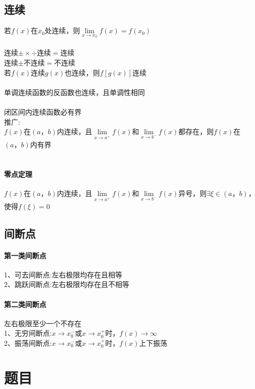 \documentclass{article}
\begin{document}
\begin{flushleft}
	\subsection{连续}
	
	若$f(x)$在$x_0$处连续，则$\lim\limits_{x\to x_0} f(x)=f(x_0)$\\
	~\\
	连续$\pm\times\div$连续$=$连续\\
	连续$\pm$不连续$=$不连续\\
	若$f(x)$连续$g(x)$也连续，则$f[g(x)]$连续\\
	~\\
	单调连续函数的反函数也连续，且单调性相同\\
	~\\
	闭区间内连续函数必有界\\
	推广:\\
	$f(x)$在$(a，b)$内连续，且$\lim\limits_{x\to a^+} f(x)$和$\lim\limits_{x\to b^-} f(x)$都存在，则$f(x)$在$(a，b)$内有界\\
	~\\
	\paragraph{零点定理}
	$f(x)$在$(a，b)$内连续，且$\lim\limits_{x\to a^+} f(x)$和$\lim\limits_{x\to b^-} f(x)$异号，则$\exists \xi \in (a，b)$，使得$f(\xi)=0$\\
	
	\subsection{间断点}
	
	\paragraph{第一类间断点}
	1、可去间断点:左右极限均存在且相等\\
	2、跳跃间断点:左右极限均存在且不相等\\
	\paragraph{第二类间断点}
	左右极限至少一个不存在\\
	1、无穷间断点:$x\to x_0^-$或$x\to x_0^+$时，$f(x)\to \infty$\\
	2、振荡间断点:$x\to x_0^-$或$x\to x_0^+$时，$f(x)$上下振荡\\

	\section{题目}
	

\end{flushleft}
\end{document}
